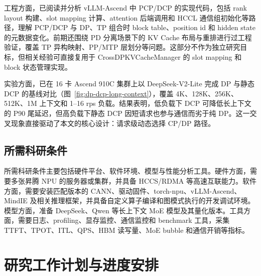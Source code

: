 工程方面，已阅读并分析 vLLM-Ascend 中 PCP/DCP 的实现代码，包括 rank layout 构建、slot mapping 计算、attention 后端调用和 HCCL 通信组初始化等路径，理解 PCP/DCP 与 DP、TP 组合时 block table、position id 和 hidden state 的元数据变化。前期还围绕 PD 分离场景下的 KV Cache 布局与重排进行过工程验证，覆盖 TP 异构映射、PP/MTP 层划分等问题。这部分不作为独立研究目标，但相关经验可直接复用于 CrossDPKVCacheManager 的 slot mapping 和 block 状态管理实现。

实验方面，已在 16 卡 Ascend 910C 集群上以 DeepSeek-V2-Lite 完成 DP 与静态 DCP 的基线对比（图~\ref{fig:dp-dcp-long-context}），覆盖 4K、128K、256K、512K、1M 上下文和 1--16 rps 负载。结果表明，低负载下 DCP 可降低长上下文的 P90 尾延迟，但高负载下静态 DCP 因短请求也参与通信而劣于纯 DP。这一交叉现象直接驱动了本文的核心设计：请求级动态选择 CP/DP 路径。

\subsection{所需科研条件}

所需科研条件主要包括硬件平台、软件环境、模型与性能分析工具。硬件方面，需要多张昇腾 NPU 的服务器或集群，并具备 HCCS/RDMA 等高速互联能力。软件方面，需要安装匹配版本的 CANN、驱动固件、torch-npu、vLLM-Ascend、MindIE 及相关推理框架，并具备自定义算子编译和图模式执行的开发调试环境。模型方面，准备 DeepSeek、Qwen 等长上下文 MoE 模型及其量化版本。工具方面，需要日志、profiling、显存监控、通信监控和 benchmark 工具，采集 TTFT、TPOT、ITL、QPS、HBM 读写量、MoE bubble 和通信开销等指标。

\section{研究工作计划与进度安排}

